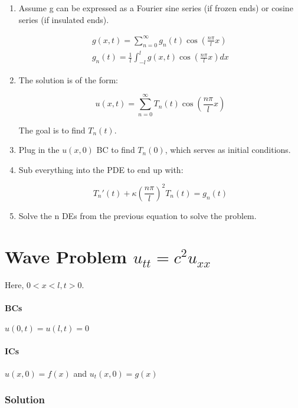 \documentclass[11pt]{article}
\begin{document}
\begin{enumerate}

\item Assume g can be expressed as a Fourier sine series (if frozen ends) or cosine series (if insulated ends).

\begin{align*}
g(x,t) = \sum \limits_{n=0}^{\infty} g_n(t) \cos(\frac{n\pi}{l}x) \\
g_n(t) = \frac{1}{l} \int_{-l}^{l} g(x,t) \cos(\frac{n\pi}{l}x) dx
\end{align*}

\item The solution is of the form:

$$ u(x,t) = \sum \limits_{n=0}^{\infty} T_n(t) \cos(\frac{n\pi}{l}x) $$

The goal is to find $T_n(t)$.

\item Plug in the $u(x,0)$ BC to find $T_n(0)$, which serves as initial conditions.

\item Sub everything into the PDE to end up with:

$$ T_n'(t) + \kappa (\frac{n\pi}{l})^2 T_n(t) = g_n(t) $$

\item Solve the n DEs from the previous equation to solve the problem.

\end{enumerate}


\section{Wave Problem $u_{tt}=c^2u_{xx}$}
Here, $0<x<l, t>0$. 
\paragraph{BCs} $u(0,t) = u(l,t) = 0$
\paragraph{ICs} $u(x,0) = f(x)$ and $u_t(x,0) = g(x)$

\subsubsection*{Solution}
\end{document}
